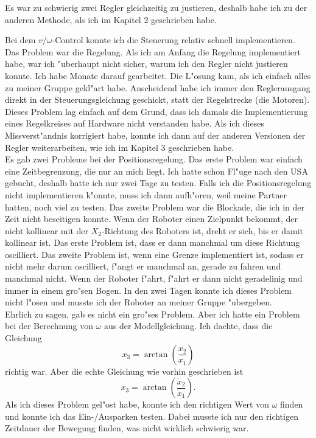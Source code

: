 Es war zu schwierig zwei Regler gleichzeitig zu justieren, deshalb habe ich zu der anderen Methode, als ich im Kapitel 2 geschrieben habe.

Bei dem \(v/\omega\)-Control konnte ich die Steuerung relativ schnell implementieren. Das Problem war die Regelung. Als ich am Anfang die Regelung implementiert habe, war ich "uberhaupt nicht sicher, warum ich den Regler nicht justieren konnte. Ich habe Monate darauf gearbeitet. Die L"osung kam, als ich einfach alles zu meiner Gruppe gekl"art habe. Anscheidend habe ich immer den Reglerausgang direkt in der Steuerungsgleichung geschickt, statt der Regelstrecke (die Motoren). Dieses Problem lag einfach auf dem Grund, dass ich damals die Implementierung eines Regelkreises auf Hardware nicht verstanden habe. Als ich dieses Missverst"andnis korrigiert habe, konnte ich dann auf der anderen Versionen der Regler weiterarbeiten, wie ich im Kapitel 3 geschrieben habe. \\ 

Es gab zwei Probleme bei der Positionsregelung. Das erste Problem war einfach eine Zeitbegrenzung, die nur an mich liegt. Ich hatte schon Fl"uge nach den USA gebucht, deshalb hatte ich nur zwei Tage zu testen. Falls ich die Positionsregelung nicht implementieren k"onnte, muss ich dann aufh"oren, weil meine Partner hatten, noch viel zu testen. Das zweite Problem war die Blockade, die ich in der Zeit nicht beseitigen konnte. Wenn der Roboter einen Zielpunkt bekommt, der nicht kollinear mit der \(X_2\)-Richtung des Roboters ist, dreht er sich, bis er damit kollinear ist. Das erste Problem ist, dass er dann manchmal um diese Richtung oscilliert. Das zweite Problem ist, wenn eine Grenze implementiert ist, sodass er nicht mehr darum oscilliert, f"angt er manchmal an, gerade zu fahren und manchmal nicht. Wenn der Roboter f"ahrt, f"ahrt er dann nicht geradelinig und immer in einem gro"sen Bogen. In den zwei Tagen konnte ich dieses Problem nicht l"osen und musste ich der Roboter an meiner Gruppe "ubergeben. \\

Ehrlich zu sagen, gab es nicht ein gro"ses Problem. Aber ich hatte ein Problem bei der Berechnung von \(\omega\) aus der Modellgleichung. Ich dachte, dass die Gleichung 
\begin{equation*}
    x_3 = \arctan(\frac{x_2}{x_1})
\end{equation*}
richtig war. Aber die echte Gleichung wie vorhin geschrieben ist
\begin{equation*}
    x_3 = \arctan(\frac{\dot{x}_2}{\dot{x}_1}).
\end{equation*}
Als ich dieses Problem gel"ost habe, konnte ich den richtigen Wert von \(\omega\) finden und konnte ich das Ein-/Ausparken testen. Dabei musste ich nur den richtigen Zeitdauer der Bewegung finden, was nicht wirklich schwierig war.